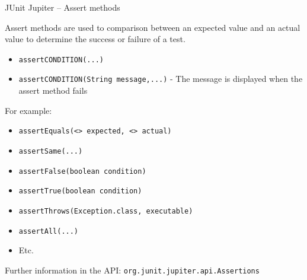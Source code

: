 \documentclass[11pt, xcolor=svgnames]{beamer}
\begin{document}
\begin{frame}{JUnit Jupiter -- Assert methods}

Assert methods are used to comparison between an expected value and an actual value to determine the success or failure of a test.
  
      \begin{itemize}
        \item \texttt{assertCONDITION(...)}
        \item \texttt{assertCONDITION(String message,...)} - The message is displayed when the assert method fails
      \end{itemize}
  
For example:

      \begin{itemize}
        \item \texttt{assertEquals(<> expected, <> actual)}
        \item \texttt{assertSame(...)} 
        \item \texttt{assertFalse(boolean condition)}
        \item \texttt{assertTrue(boolean condition)}
  \item \texttt{assertThrows(Exception.class, executable)}
  \item \texttt{assertAll(...)}
        \item Etc.
      \end{itemize}

Further information in the API: \texttt{org.junit.jupiter.api.Assertions}

  
\end{frame}

\end{document}
